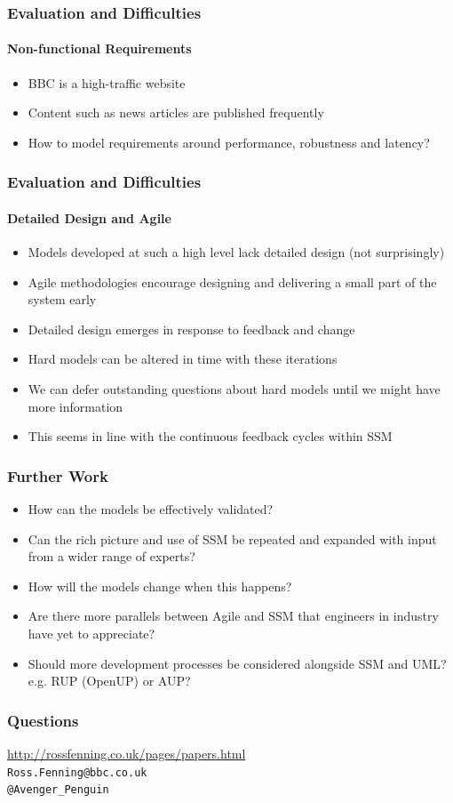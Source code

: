 \documentclass{beamer}
\begin{document}
\begin{frame}
  \frametitle{Evaluation and Difficulties}
  \framesubtitle{Non-functional Requirements}
  \begin{itemize}
    \pause \item BBC is a high-traffic website
    \pause \item Content such as news articles are published frequently
    \pause \item How to model requirements around performance, robustness and latency?
  \end{itemize}
\end{frame}

\begin{frame}
  \frametitle{Evaluation and Difficulties}
  \framesubtitle{Detailed Design and Agile}
  \begin{itemize}
    \pause \item Models developed at such a high level lack detailed design (not surprisingly)
    \pause \item Agile methodologies encourage designing and delivering a small part of the system early
    \pause \item Detailed design emerges in response to feedback and change
    \pause \item Hard models can be altered in time with these iterations
    \pause \item We can defer outstanding questions about hard models until we might have more information
    \pause \item This seems in line with the continuous feedback cycles within SSM
  \end{itemize}
\end{frame}


\begin{frame}
  \frametitle{Further Work}
  \begin{itemize}
    \pause \item How can the models be effectively validated?
    \pause \item Can the rich picture and use of SSM be repeated and expanded with input from a wider range of experts?
    \pause \item How will the models change when this happens?
    \pause \item Are there more parallels between Agile and SSM that engineers in industry have yet to appreciate?
    \pause \item Should more development processes be considered alongside SSM and UML? e.g. RUP (OpenUP) or AUP?
  \end{itemize}
\end{frame}

\begin{frame}
  \frametitle{Questions}
  \begin{center}
    \url{http://rossfenning.co.uk/pages/papers.html}\\
    \texttt{Ross.Fenning@bbc.co.uk}\\
    \texttt{@Avenger\_Penguin}
  \end{center}
\end{frame}
\end{document}
